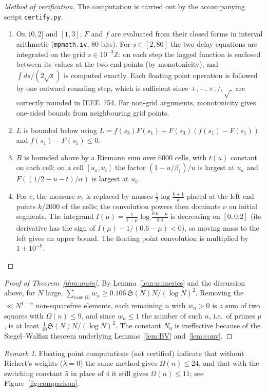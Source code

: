 \documentclass[11pt]{amsart}
\theoremstyle{remark}
\newtheorem{remark}[theorem]{Remark}
\newcommand{\Sg}{\mathfrak{S}}
\begin{document}
\begin{proof}[Method of verification]
The computation is carried out by the accompanying script \texttt{certify.py}.
\begin{enumerate}
\item On $(0,2]$ and $[1,3]$, $F$ and $f$ are evaluated from their closed forms in interval arithmetic
(\texttt{mpmath.iv}, 80 bits). For $s\in[2,80]$ the two delay equations are integrated on the grid
$s\in 10^{-3}\mathbb Z$: on each step the lagged function is enclosed between its values at the two
end points (by monotonicity), and $\int ds/(2\sqrt s)$ is computed exactly. Each floating point operation
is followed by one outward rounding step, which is sufficient since $+,-,\times,/,\sqrt{\ }$ are correctly
rounded in IEEE~754. For non-grid arguments, monotonicity gives one-sided bounds from neighbouring grid
points.
\item $L$ is bounded below using $L=f(s_3)F(s_1)+F(s_3)(f(s_1)-F(s_1))$ and $f(s_1)-F(s_1)\le 0$.
\item $R$ is bounded above by a Riemann sum over $6000$ cells, with $t(u)$ constant on each cell; on a cell
$[u_a,u_b]$ the factor $(1-u/\beta_1)/u$ is largest at $u_a$ and $F((1/2-u-t)/\alpha)$ is largest at $u_b$.
\item For $c$, the measure $\nu_1$ is replaced by masses $\frac12\log\frac{k+1}{k}$ placed at the left end
points $k/2000$ of the cells; the convolution powers then dominate $\nu$ on initial segments. The
integrand $I(\mu)=\frac{1}{1-\mu}\log\frac{0.6-\mu}{0.4}$ is decreasing on $[0,0.2]$ (its derivative has the
sign of $I(\mu)-1/(0.6-\mu)<0$), so moving mass to the left gives an upper bound. The floating point
convolution is multiplied by $1+10^{-9}$.
\end{enumerate}
\end{proof}

\begin{proof}[Proof of Theorem~\ref{thm:main}]
By Lemma~\ref{lem:numerics} and the discussion above, for $N$ large,
$\sum_{\text{case (i)}}w_n\ge 0.106\,\Sg(N)N/(\log N)^2$. Removing the $\ll N^{1-\alpha}$ non-squarefree
elements, each remaining $n$ with $w_n>0$ is a sum of two squares with $\Omega(n)\le 9$, and since
$w_n\le1$ the number of such $n$, i.e.\ of primes $p$, is at least $\frac1{10}\Sg(N)N/(\log N)^2$.
The constant $N_0$ is ineffective because of the Siegel--Walfisz theorem underlying Lemmas~\ref{lem:BV}
and~\ref{lem:conv}.
\end{proof}

\begin{remark}\label{rem:float}
Floating point computations (not certified) indicate that without Richert's weights ($\lambda=0$) the
same method gives $\Omega(n)\le 24$, and that with the switching constant $5$ in place of $4$ it still gives
$\Omega(n)\le 11$; see Figure~\ref{fig:comparison}.
\end{remark}
\end{document}
